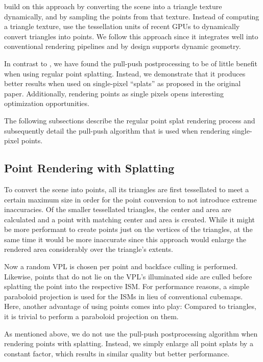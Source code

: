 \citet{ritschel2011ismsViewAdaptive} build on this approach by converting the scene into a triangle texture dynamically, and by sampling the points from that texture. Instead of computing a triangle texture, \citet{barak2013temporally} use the tessellation units of recent GPUs to dynamically convert triangles into points.
We follow this approach since it integrates well into conventional rendering pipelines and by design supports dynamic geometry.

In contrast to \citet{ritschel2008ism}, we have found the pull-push postprocessing to be of little benefit when using regular point splatting. Instead, we demonstrate that it produces better results when used on single-pixel ``splats'' as proposed in the original paper. Additionally, rendering points as single pixels opens interesting optimization opportunities.

The following subsections describe the regular point splat rendering process and subsequently detail the pull-push algorithm that is used when rendering single-pixel points.


\subsection{Point Rendering with Splatting}

To convert the scene into points, all its triangles are first tessellated to meet a certain maximum size in order for the point conversion to not introduce extreme inaccuracies. Of the smaller tessellated triangles, the center and area are calculated and a point with matching center and area is created. While it might be more performant to create points just on the vertices of the triangles, at the same time it would be more inaccurate since this approach would enlarge the rendered area considerably over the triangle's extents.

Now a random VPL is chosen per point and backface culling is performed. Likewise, points that do not lie on the VPL's illuminated side are culled before splatting the point into the respective ISM. For performance reasons, a simple paraboloid projection is used for the ISMs in lieu of conventional cubemaps. Here, another advantage of using points comes into play: Compared to triangles, it is trivial to perform a paraboloid projection on them.

As mentioned above, we do not use the pull-push postprocessing algorithm when rendering points with splatting. Instead, we simply enlarge all point splats by a constant factor, which results in similar quality but better performance.


